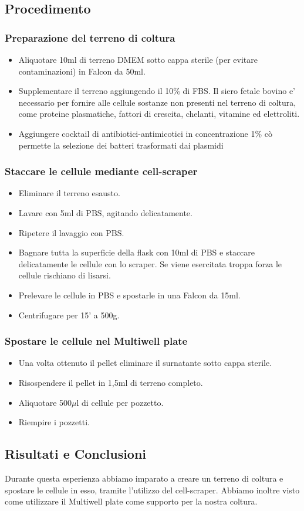 \subsection{Procedimento}

\subsubsection{Preparazione del terreno di coltura}

\begin{itemize}
	\item Aliquotare 10ml di terreno DMEM sotto cappa sterile
	(per evitare contaminazioni) in Falcon da 50ml.
	\item Supplementare il terreno aggiungendo il 10\% di FBS.
	Il siero fetale bovino e' necessario per fornire alle cellule sostanze non
	presenti nel terreno di coltura, come proteine plasmatiche,
	fattori di crescita, chelanti, vitamine ed elettroliti.
	\item Aggiungere cocktail di antibiotici-antimicotici in concentrazione 1\%
	c\`o permette la selezione dei batteri trasformati dai plasmidi
\end{itemize}

\subsubsection{Staccare le cellule mediante cell-scraper}
\begin{itemize}
	\item Eliminare il terreno esausto.
	\item Lavare con 5ml di PBS, agitando delicatamente.
	\item Ripetere il lavaggio con PBS.
	\item Bagnare tutta la superficie della flask con 10ml di PBS e staccare
	delicatamente le cellule con lo scraper. Se viene esercitata troppa forza le
	cellule rischiano di lisarsi.
	\item Prelevare le cellule in PBS e spostarle in una Falcon da 15ml.
	\item Centrifugare per 15' a 500g.
\end{itemize}

\subsubsection{Spostare le cellule nel Multiwell plate}
\begin{itemize}
	\item Una volta ottenuto il pellet eliminare il surnatante sotto cappa sterile.
	\item Risospendere il pellet in 1,5ml di terreno completo.
	\item Aliquotare 500$\mu$l di cellule per pozzetto.
	\item Riempire i pozzetti.
\end{itemize}

\subsection{Risultati e Conclusioni}

Durante questa esperienza abbiamo imparato a creare un terreno di coltura
e spostare le cellule in esso, tramite l'utilizzo del cell-scraper.
Abbiamo inoltre visto come utilizzare il Multiwell plate come supporto per la
nostra coltura.
